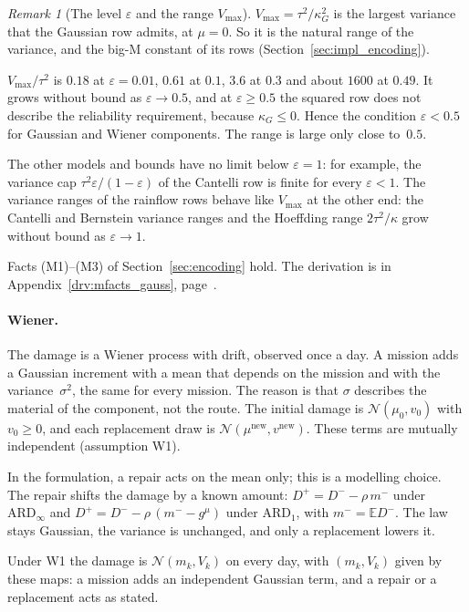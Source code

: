 \documentclass[11pt,a4paper]{article}
\theoremstyle{plain}
\theoremstyle{definition}
\theoremstyle{remark}
\newtheorem{remark}[theorem]{Remark}
\begin{document}
\begin{remark}[The level $\varepsilon$ and the range $V_{\max}$]\label{rem:vmax}
$V_{\max} = \tau^2/\kappa_G^2$ is the largest variance that the Gaussian row admits, at $\mu = 0$.
So it is the natural range of the variance, and the big-M constant of its rows (Section~\ref{sec:impl_encoding}).

$V_{\max}/\tau^2$ is $0.18$ at $\varepsilon = 0.01$, $0.61$ at $0.1$, $3.6$ at $0.3$ and about $1600$ at $0.49$.
It grows without bound as $\varepsilon \to 0.5$, and at $\varepsilon \ge 0.5$ the squared row does not describe the reliability requirement, because $\kappa_G \le 0$.
Hence the condition $\varepsilon < 0.5$ for Gaussian and Wiener components.
The range is large only close to~$0.5$.

The other models and bounds have no limit below $\varepsilon = 1$: for example, the variance cap $\tau^2\varepsilon/(1-\varepsilon)$ of the Cantelli row is finite for every $\varepsilon < 1$.
The variance ranges of the rainflow rows behave like $V_{\max}$ at the other end: the Cantelli and Bernstein variance ranges and the Hoeffding range $2\tau^2/\kappa$ grow without bound as $\varepsilon \to 1$.
\end{remark}

Facts (M1)--(M3) of Section~\ref{sec:encoding} hold.
The derivation is in Appendix~\ref{drv:mfacts_gauss}, page~\pageref{drv:mfacts_gauss}.

\paragraph{Wiener.}
The damage is a Wiener process with drift, observed once a day.
A mission adds a Gaussian increment with a mean that depends on the mission and with the variance~$\sigma^2$, the same for every mission.
The reason is that $\sigma$ describes the material of the component, not the route.
The initial damage is $\mathcal{N}(\mu_0, v_0)$ with $v_0 \ge 0$, and each replacement draw is $\mathcal{N}(\mu^{\mathrm{new}}, v^{\mathrm{new}})$.
These terms are mutually independent (assumption W1).

In the formulation, a repair acts on the mean only; this is a modelling choice.
The repair shifts the damage by a known amount: $D^+ = D^- - \rho\, m^-$ under $\text{ARD}_\infty$ and $D^+ = D^- - \rho\,(m^- - g^{\mu})$ under $\text{ARD}_1$, with $m^- = \mathbb{E}D^-$.
The law stays Gaussian, the variance is unchanged, and only a replacement lowers it.

Under W1 the damage is $\mathcal{N}(m_k, V_k)$ on every day, with $(m_k, V_k)$ given by these maps: a mission adds an independent Gaussian term, and a repair or a replacement acts as stated.
\end{document}
